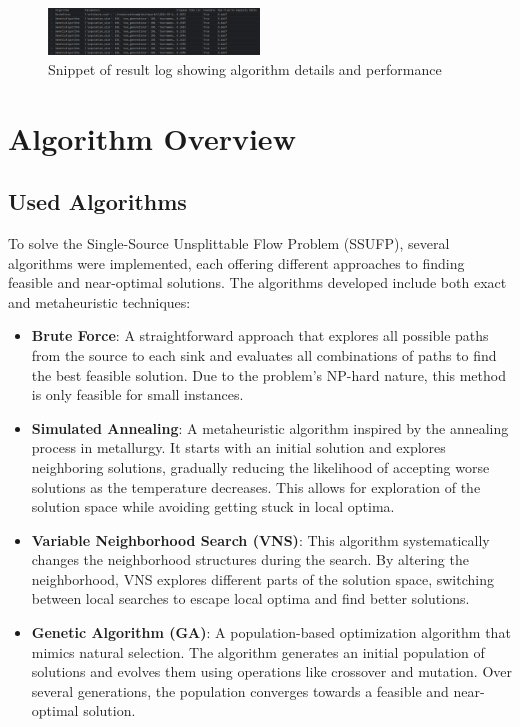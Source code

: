 \documentclass[a4paper,12pt]{article}
\begin{document}
\begin{figure}[H]
    \centering
    \includegraphics[width=0.5\textwidth]{report-snippet.png}
    \caption{Snippet of result log showing algorithm details and performance}
\end{figure}

\section{Algorithm Overview}

\subsection{Used Algorithms}

To solve the Single-Source Unsplittable Flow Problem (SSUFP), several algorithms were implemented, each offering different approaches to finding feasible and near-optimal solutions. The algorithms developed include both exact and metaheuristic techniques:

\begin{itemize}
    \item \textbf{Brute Force}: A straightforward approach that explores all possible paths from the source to each sink and evaluates all combinations of paths to find the best feasible solution. Due to the problem's NP-hard nature, this method is only feasible for small instances.
    
    \item \textbf{Simulated Annealing}: A metaheuristic algorithm inspired by the annealing process in metallurgy. It starts with an initial solution and explores neighboring solutions, gradually reducing the likelihood of accepting worse solutions as the temperature decreases. This allows for exploration of the solution space while avoiding getting stuck in local optima.
    
    \item \textbf{Variable Neighborhood Search (VNS)}: This algorithm systematically changes the neighborhood structures during the search. By altering the neighborhood, VNS explores different parts of the solution space, switching between local searches to escape local optima and find better solutions.
    
    \item \textbf{Genetic Algorithm (GA)}: A population-based optimization algorithm that mimics natural selection. The algorithm generates an initial population of solutions and evolves them using operations like crossover and mutation. Over several generations, the population converges towards a feasible and near-optimal solution.
\end{itemize}
\end{document}
